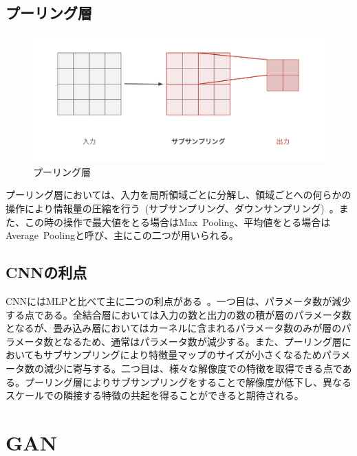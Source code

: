 \clearpage

\subsection{プーリング層}

\begin{figure}[b]
\begin{center}
\includegraphics[width=\hsize]{figure/pooling.png}
\caption{プーリング層}
\label{fig:pooling}
\end{center}
\end{figure}

プーリング層においては、入力を局所領域ごとに分解し、領域ごとへの何らかの操作により情報量の圧縮を行う~(サブサンプリング、ダウンサンプリング)~。また、この時の操作で最大値をとる場合はMax~Pooling、平均値をとる場合はAverage~Poolingと呼び、主にこの二つが用いられる。

\subsection{CNNの利点}

CNNにはMLPと比べて主に二つの利点がある~\cite{CNNsurvey}。一つ目は、パラメータ数が減少する点である。全結合層においては入力の数と出力の数の積が層のパラメータ数となるが、畳み込み層においてはカーネルに含まれるパラメータ数のみが層のパラメータ数となるため、通常はパラメータ数が減少する。また、プーリング層においてもサブサンプリングにより特徴量マップのサイズが小さくなるためパラメータ数の減少に寄与する。二つ目は、様々な解像度での特徴を取得できる点である。プーリング層によりサブサンプリングをすることで解像度が低下し、異なるスケールでの隣接する特徴の共起を得ることができると期待される。

\clearpage

\section{GAN}

